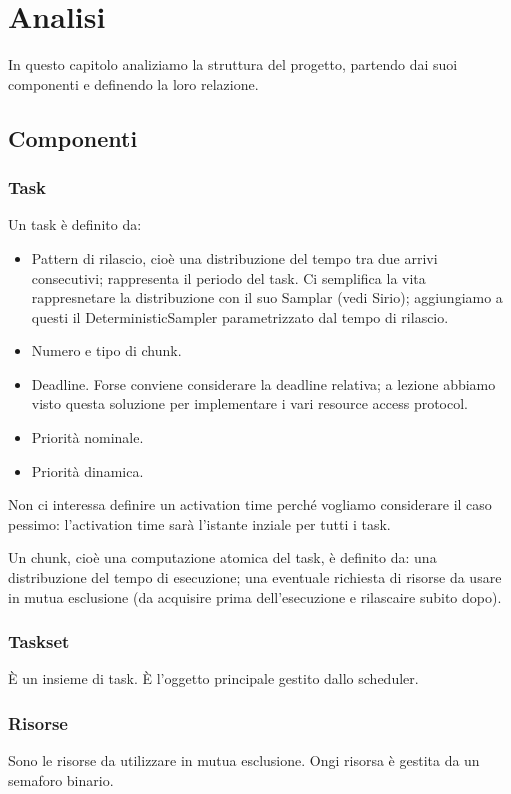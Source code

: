 \chapter{Analisi}
In questo capitolo analiziamo la struttura del progetto, partendo dai suoi componenti e definendo la loro relazione.

\section{Componenti}

\subsection{Task}
Un task è definito da:
\begin{itemize}
    \item Pattern di rilascio, cioè una distribuzione del tempo tra due arrivi consecutivi; rappresenta il periodo del task. Ci semplifica la vita rappresnetare la distribuzione con il suo Samplar (vedi Sirio); aggiungiamo a questi il DeterministicSampler parametrizzato dal tempo di rilascio.
    \item Numero e tipo di chunk.
    \item Deadline. Forse conviene considerare la deadline relativa; a lezione abbiamo visto questa soluzione per implementare i vari resource access protocol.
    \item Priorità nominale.
    \item Priorità dinamica.
\end{itemize}

Non ci interessa definire un activation time perché vogliamo considerare il caso pessimo: l'activation time sarà l'istante inziale per tutti i task.

\myskip

Un chunk, cioè una computazione atomica del task, è definito da: una distribuzione del tempo di esecuzione; una eventuale richiesta di risorse da usare in mutua esclusione (da acquisire prima dell'esecuzione e rilascaire subito dopo).

\subsection{Taskset}
È un insieme di task. È l'oggetto principale gestito dallo scheduler.

\subsection{Risorse}
Sono le risorse da utilizzare in mutua esclusione. Ongi risorsa è gestita da un semaforo binario.

